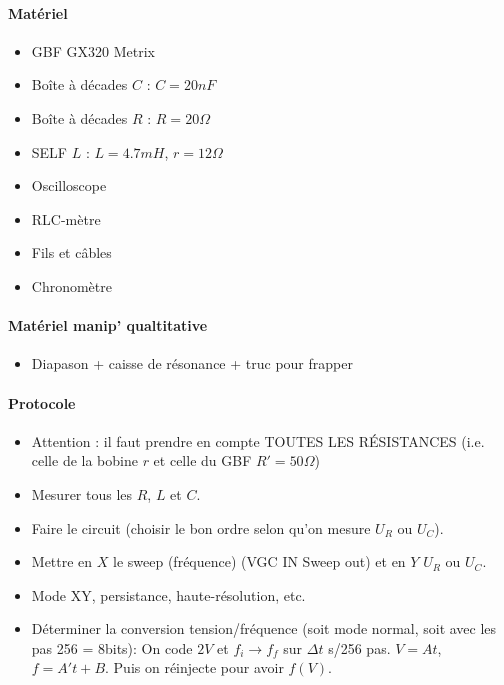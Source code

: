 \documentclass[11pt]{report}
\numberwithin{figure}{section}
\numberwithin{equation}{section}
\numberwithin{table}{section}
\newcommand{\1}{\boldsymbol{1}}
\begin{document}
\begin{tcolorbox}[breakable, enhanced, colback=red!2!white,colframe=mycolor!85!black,title=\textbf{\textbf{Expérience}}]
\paragraph*{Matériel}
\begin{itemize}
\item GBF GX320 Metrix
\item Boîte à décades $C$ : $C = 20nF$
\item Boîte à décades $R$ : $R = 20 \Omega$
\item SELF $L$ : $L = 4.7 mH$, $r = 12 \Omega$
\item Oscilloscope
\item RLC-mètre
\item Fils et câbles
\item Chronomètre
\end{itemize}

\paragraph*{Matériel manip' qualtitative}
\begin{itemize}
\item Diapason + caisse de résonance + truc pour frapper
\end{itemize}

\paragraph*{Protocole } 

\begin{itemize}[label=$\triangleright$]
		\item Attention : il faut prendre en compte TOUTES LES RÉSISTANCES (i.e. celle de la bobine $r$ et celle du GBF $R' = 50 \Omega$)
		\item Mesurer tous les $R$, $L$ et $C$.
		\item Faire le circuit (choisir le bon ordre selon qu'on mesure $U_R$ ou $U_C$).
		\item Mettre en $X$ le sweep (fréquence) (VGC IN Sweep out) et en $Y$ $U_R$ ou $U_C$.
		\item Mode XY, persistance, haute-résolution, etc.
		\item Déterminer la conversion tension/fréquence (soit mode normal, soit avec les pas 256 = 8bits): On code $2V$ et $f_i \rightarrow f_f$ sur $\Delta t$ s/256 pas. $V = At$, $f = A' t + B$. Puis on réinjecte pour avoir $f(V)$.
\end{itemize}


\end{tcolorbox}
\end{document}
